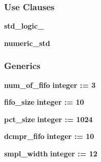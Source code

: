 \subsubsection*{Use Clauses}
 \begin{DoxyCompactItemize}
\item 
{\bf std\+\_\+logic\+\_}   
\item 
{\bf numeric\+\_\+std}   
\end{DoxyCompactItemize}
\subsubsection*{Generics}
 \begin{DoxyCompactItemize}
\item 
{\bf num\+\_\+of\+\_\+fifo} {\bfseries {\bfseries \textcolor{comment}{integer}\textcolor{vhdlchar}{ }\textcolor{vhdlchar}{ }\textcolor{vhdlchar}{\+:}\textcolor{vhdlchar}{=}\textcolor{vhdlchar}{ }\textcolor{vhdlchar}{ } \textcolor{vhdldigit}{3} \textcolor{vhdlchar}{ }}}
\item 
{\bf fifo\+\_\+size} {\bfseries {\bfseries \textcolor{comment}{integer}\textcolor{vhdlchar}{ }\textcolor{vhdlchar}{ }\textcolor{vhdlchar}{\+:}\textcolor{vhdlchar}{=}\textcolor{vhdlchar}{ }\textcolor{vhdlchar}{ } \textcolor{vhdldigit}{10} \textcolor{vhdlchar}{ }}}
\item 
{\bf pct\+\_\+size} {\bfseries {\bfseries \textcolor{comment}{integer}\textcolor{vhdlchar}{ }\textcolor{vhdlchar}{ }\textcolor{vhdlchar}{\+:}\textcolor{vhdlchar}{=}\textcolor{vhdlchar}{ }\textcolor{vhdlchar}{ } \textcolor{vhdldigit}{1024} \textcolor{vhdlchar}{ }}}
\item 
{\bf dcmpr\+\_\+fifo} {\bfseries {\bfseries \textcolor{comment}{integer}\textcolor{vhdlchar}{ }\textcolor{vhdlchar}{ }\textcolor{vhdlchar}{\+:}\textcolor{vhdlchar}{=}\textcolor{vhdlchar}{ }\textcolor{vhdlchar}{ } \textcolor{vhdldigit}{10} \textcolor{vhdlchar}{ }}}
\item 
{\bf smpl\+\_\+width} {\bfseries {\bfseries \textcolor{comment}{integer}\textcolor{vhdlchar}{ }\textcolor{vhdlchar}{ }\textcolor{vhdlchar}{\+:}\textcolor{vhdlchar}{=}\textcolor{vhdlchar}{ }\textcolor{vhdlchar}{ } \textcolor{vhdldigit}{12} \textcolor{vhdlchar}{ }}}
\end{DoxyCompactItemize}
